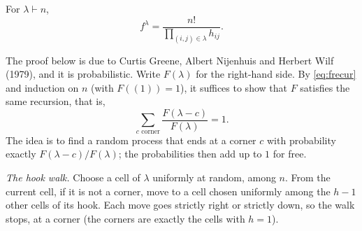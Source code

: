 \begin{theorem}\label{thm:hook}
For $\lambda\vdash n$,
\[
f^\lambda=\frac{n!}{\prod_{(i,j)\in\lambda}h_{ij}}.
\]
\end{theorem}

The proof below is due to Curtis Greene, Albert Nijenhuis and Herbert Wilf (1979), and it is probabilistic. Write $F(\lambda)$ for the right-hand side. By \eqref{eq:frecur} and induction on $n$ (with $F((1))=1$), it suffices to show that
$F$ satisfies the same recursion, that is,
\begin{equation}\label{eq:hooksum}
\sum_{c\text{ corner}}\frac{F(\lambda-c)}{F(\lambda)}=1.
\end{equation}
The idea is to find a random process that ends at a corner $c$ with probability exactly $F(\lambda-c)/F(\lambda)$; the probabilities then add up to $1$ for free.

\emph{The hook walk.} Choose a cell of $\lambda$ uniformly at random, among $n$. From the current cell, if it is not a corner, move to a cell chosen uniformly among the $h-1$ other cells of its hook. Each move goes strictly right or strictly
down, so the walk stops, at a corner (the corners are exactly the cells with $h=1$).

